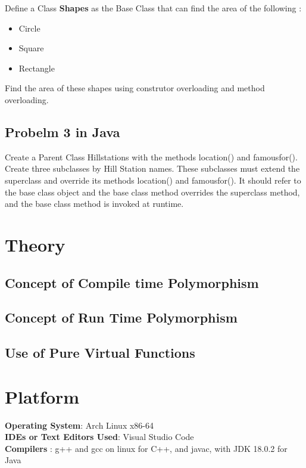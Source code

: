 \documentclass[11pt]{article}
\begin{document}
Define a Class \textbf{Shapes} as the Base Class that can find the area of the following : 
\begin{itemize}
	\item Circle
	\item Square
	\item Rectangle
\end{itemize}

Find the area of these shapes using construtor overloading and method overloading. 

\subsection{Probelm 3 in Java}
Create a Parent Class Hillstations with the methods location() and famousfor().
Create three subclasses by Hill Station names. 
These subclasses must extend the superclass and override its methods location() and famousfor().
It should refer to the base class object and the base class method overrides the superclass method, and the base class method is invoked at runtime. 

\section{Theory}

\subsection{Concept of Compile time Polymorphism}

\subsection{Concept of Run Time Polymorphism}

\subsection{Use of Pure Virtual Functions}

\section{Platform}
\textbf{Operating System}: Arch Linux x86-64 \\
\textbf{IDEs or Text Editors Used}: Visual Studio Code\\
\textbf{Compilers} : g++ and gcc on linux for C++, and javac, with JDK 18.0.2 for Java\\
\end{document}
